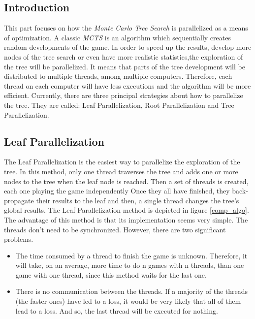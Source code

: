 \label{third part}
\subsection{Introduction}

This part focuses on how the \emph{Monte Carlo Tree Search} is parallelized as a means of optimization. A classic \emph{MCTS} is an algorithm which sequentially creates random developments of the game. In order to speed up the results, develop more nodes of the tree search or even have more realistic statistics,the exploration of the tree will be parallelized. It means that parts of the tree development will be distributed to multiple threads, among multiple computers. Therefore, each thread on each computer will have less executions and the algorithm will be more efficient.
\newline
\newline
Currently, there are three principal strategies about how to parallelize the tree. They are called: Leaf Parallelization, Root Parallelization and Tree Parallelization\cite{parallel_comp, master_mcts_kozeleck}.

\subsection{Leaf Parallelization}

The Leaf Parallelization is the easiest way to parallelize the exploration of the tree. In this method, only one thread traverses the tree and adds one or more nodes to the tree when the leaf node is reached. Then a set of threads is created, each one playing the game independently Once they all have finished, they back-propagate their results to the leaf and then, a single thread changes the tree’s global results. The Leaf Parallelization method is depicted in figure \ref{comp_algo}.
\newline
\newline
The advantage of this method is that its implementation seems very simple. The threads don't need to be synchronized. However, there are two significant problems.
\begin{itemize}
     \item The time consumed by a thread to finish the game is unknown. Therefore, it will take, on an average, more time to do n games with n threads, than one game with one thread, since this method waits for the last one.
     \item There is no communication between the threads. If a majority of the threads (the faster ones) have led to a loss, it would be very likely that all of them lead to a loss. And so, the last thread will be executed for nothing. 
  \end{itemize}


